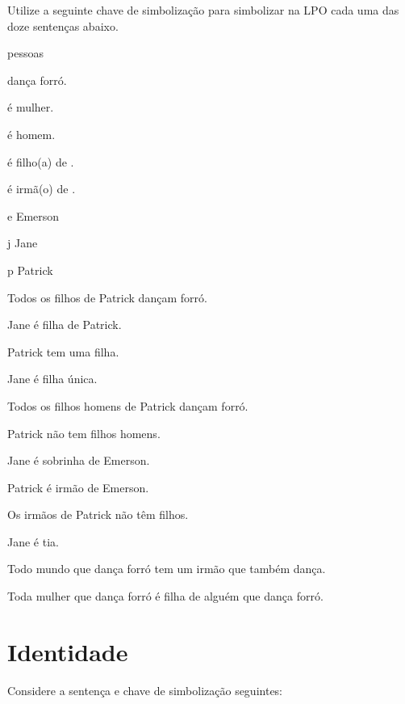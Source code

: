 \solutions
\problempart
\label{pr.FOLballet}
Utilize a seguinte chave de simbolização para simbolizar na LPO cada uma das doze sentenças abaixo.
\begin{center}
\begin{ekey}
\item[\text{domínio}] pessoas
\item[\atom{D}{x}]  dança forró.
\item[\atom{M}{x}]  é mulher.
\item[\atom{H}{x}]  é homem.
\item[\atom{F}{x,y}]  é filho(a) de .
\item[\atom{I}{x,y}]  é irmã(o) de .
\item[e] Emerson
\item[j] Jane
\item[p] Patrick
\end{ekey}
\end{center}
\begin{earg}
\item Todos os filhos de Patrick dançam forró.
\item Jane é filha de Patrick.
\item Patrick tem uma filha.
\item Jane é filha única.
\item Todos os filhos homens de Patrick dançam forró.
\item Patrick não tem filhos homens.
\item Jane é sobrinha de Emerson.
\item Patrick é irmão de Emerson.
\item Os irmãos de Patrick não têm filhos.
\item Jane é tia.
\item Todo mundo que dança forró tem um irmão que também dança.
\item Toda mulher que dança forró é filha de alguém que dança forró.
\end{earg}


\chapter{Identidade}
\label{sec.identity}

Considere a sentença e chave de simbolização seguintes: 

